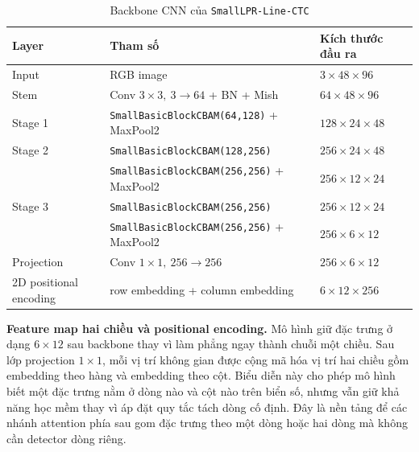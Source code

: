 \documentclass[../DoAn.tex]{subfiles}
\begin{document}
\begin{table}[htbp]
\centering
\small
\renewcommand{\arraystretch}{1.2}
\caption{Backbone CNN của \texttt{SmallLPR-Line-CTC}}
\label{tab:smalllpr-line-ctc-backbone}
\begin{tabularx}{\textwidth}{|>{\centering\arraybackslash}p{2.2cm}|>{\raggedright\arraybackslash}X|>{\centering\arraybackslash}p{3.2cm}|}
\hline
\textbf{Layer} & \textbf{Tham số} & \textbf{Kích thước đầu ra} \\
\hline
Input & RGB image & $3 \times 48 \times 96$ \\
Stem & Conv $3 \times 3,\ 3 \rightarrow 64$ + BN + Mish & $64 \times 48 \times 96$ \\
Stage 1 & \texttt{SmallBasicBlockCBAM(64,128)} + MaxPool2 & $128 \times 24 \times 48$ \\
Stage 2 & \texttt{SmallBasicBlockCBAM(128,256)} & $256 \times 24 \times 48$ \\
& \texttt{SmallBasicBlockCBAM(256,256)} + MaxPool2 & $256 \times 12 \times 24$ \\
Stage 3 & \texttt{SmallBasicBlockCBAM(256,256)} & $256 \times 12 \times 24$ \\
& \texttt{SmallBasicBlockCBAM(256,256)} + MaxPool2 & $256 \times 6 \times 12$ \\
Projection & Conv $1 \times 1,\ 256 \rightarrow 256$ & $256 \times 6 \times 12$ \\
2D positional encoding & row embedding + column embedding & $6 \times 12 \times 256$ \\
\hline
\end{tabularx}
\end{table}

\textbf{Feature map hai chiều và positional encoding.}
Mô hình giữ đặc trưng ở dạng $6 \times 12$ sau backbone thay vì làm phẳng ngay thành chuỗi một chiều. Sau lớp projection $1 \times 1$, mỗi vị trí không gian được cộng mã hóa vị trí hai chiều gồm embedding theo hàng và embedding theo cột. Biểu diễn này cho phép mô hình biết một đặc trưng nằm ở dòng nào và cột nào trên biển số, nhưng vẫn giữ khả năng học mềm thay vì áp đặt quy tắc tách dòng cố định. Đây là nền tảng để các nhánh attention phía sau gom đặc trưng theo một dòng hoặc hai dòng mà không cần detector dòng riêng.
\end{document}
